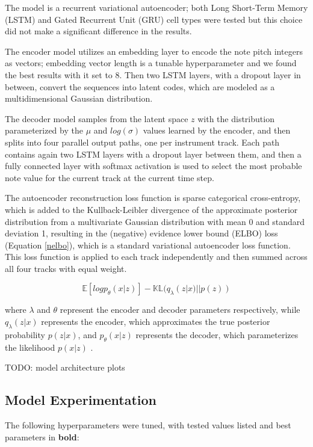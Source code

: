 \documentclass[sigconf,authorversion]{acmart}
\begin{document}
The model is a recurrent variational autoencoder; both Long Short-Term
Memory (LSTM) and Gated Recurrent Unit (GRU) cell types were tested
but this choice did not make a significant difference in the results.

The encoder model utilizes an embedding layer to encode the note pitch
integers as vectors; embedding vector length is a tunable
hyperparameter and we found the best results with it set to 8. Then
two LSTM layers, with a dropout layer in between, convert the
sequences into latent codes, which are modeled as a multidimensional
Gaussian distribution.

The decoder model samples from the latent space $z$ with the
distribution parameterized by the $\mu$ and $log(\sigma)$ values
learned by the encoder, and then splits into four parallel output
paths, one per instrument track. Each path contains again two LSTM
layers with a dropout layer between them, and then a fully connected
layer with softmax activation is used to select the most probable note
value for the current track at the current time step.

The autoencoder reconstruction loss function is sparse categorical
cross-entropy, which is added to the Kullback-Leibler divergence of
the approximate posterior distribution from a multivariate Gaussian
distribution with mean 0 and standard deviation 1, resulting in the
(negative) evidence lower bound (ELBO) loss (Equation \ref{nelbo}),
which is a standard variational autoencoder loss function. This loss
function is applied to each track independently and then summed across
all four tracks with equal weight.


\begin{equation}
  \label{nelbo}
\mathbb{E}[log{p_\theta}(x|z)]-\mathbb{KL}(q_\lambda(z|x)||p(z))
\end{equation}

where $\lambda$ and $\theta$ represent the encoder and decoder
parameters respectively, while $q_\lambda(z|x)$ represents the
encoder, which approximates the true posterior probability $p(z|x)$,
and $p_\theta(x|z)$ represents the decoder, which parameterizes the
likelihood $p(x|z)$ \cite{roberts_hierarchical_2018}.

TODO: model architecture plots

\subsection{Model Experimentation}

The following hyperparameters were tuned, with tested values listed
and best parameters in \textbf{bold}:
\end{document}

